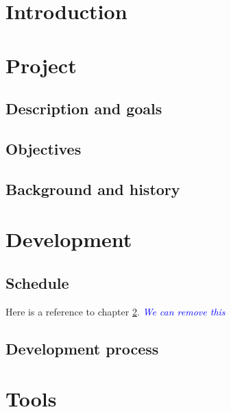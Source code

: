 \documentclass[BSP,english,oneside]{classes/gucthesis}
\newcommand{\comment}[1]{\textcolor{blue}{\emph{#1}}}
\begin{document}


\makefrontpages



\tableofcontents
\listoffigures
\listoftables

\chapter{Introduction}
	\label{chap:introduction}
	

\chapter{Project}
	\label{chap:project}

	\section{Description and goals}
	

	\section{Objectives}
	

	\section{Background and history}
	


\chapter{Development}
	\label{chap:development}

	\section{Schedule}
	
	Here is a reference to chapter \ref{chap:project}. \comment{We can remove this}

	\section{Development process}
	


\chapter{Tools}
	\label{chap:tools}
\end{document}
